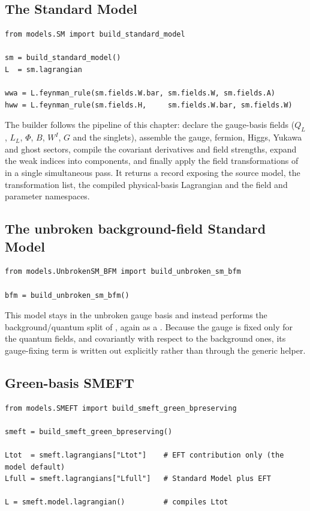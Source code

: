 \subsection*{The Standard Model}

\begin{verbatim}
from models.SM import build_standard_model

sm = build_standard_model()
L  = sm.lagrangian

wwa = L.feynman_rule(sm.fields.W.bar, sm.fields.W, sm.fields.A)
hww = L.feynman_rule(sm.fields.H,     sm.fields.W.bar, sm.fields.W)
\end{verbatim}

\noindent The builder follows the pipeline of this chapter: declare the gauge-basis fields ($Q_L$, $L_L$, $\Phi$, $B$, $W^I$, $G$ and the singlets), assemble the gauge, fermion, Higgs, Yukawa and ghost sectors, compile the covariant derivatives and field strengths, expand the weak indices into components, and finally apply the field transformations of  in a single simultaneous pass. It returns a  record exposing the source model, the transformation list, the compiled physical-basis Lagrangian and the field and parameter namespaces.


\subsection*{The unbroken background-field Standard Model}

\begin{verbatim}
from models.UnbrokenSM_BFM import build_unbroken_sm_bfm

bfm = build_unbroken_sm_bfm()
\end{verbatim}

\noindent This model stays in the unbroken gauge basis and instead performs
the background/quantum split of , again as a
. Because the gauge is fixed only for the quantum
fields, and covariantly with respect to the background ones, its gauge-fixing
term is written out explicitly rather than through the generic
 helper.

\subsection*{Green-basis SMEFT}

\begin{verbatim}
from models.SMEFT import build_smeft_green_bpreserving

smeft = build_smeft_green_bpreserving()

Ltot  = smeft.lagrangians["Ltot"]    # EFT contribution only (the model default)
Lfull = smeft.lagrangians["Lfull"]   # Standard Model plus EFT

L = smeft.model.lagrangian()         # compiles Ltot
\end{verbatim}

